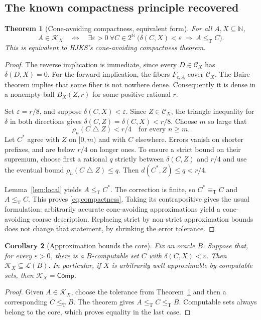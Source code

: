 \documentclass[11pt,a4paper]{article}
\newcommand{\N}{\mathbb N}
\newcommand{\Cantor}{2^{\N}}
\newcommand{\leT}{\leq_{\mathrm T}}
\newcommand{\eqT}{\equiv_{\mathrm T}}
\newcommand{\CD}[1]{\mathcal C_{#1}}
\newcommand{\Core}[1]{\mathcal K_{#1}}
\newcommand{\Low}[1]{\mathcal L(#1)}
\newcommand{\Comp}{\mathsf{Comp}}
\newcommand{\sdelta}{\mathbin{\triangle}}
\newtheorem{theorem}{Theorem}[section]
\newtheorem{corollary}[theorem]{Corollary}
\theoremstyle{definition}\newtheorem{definition}[theorem]{Definition}
\theoremstyle{remark}\newtheorem{remark}[theorem]{Remark}
\begin{document}
\subsection{The known compactness principle recovered}
\begin{theorem}[Cone-avoiding compactness, equivalent form]\label{thm:compactness}
For all $A,X\subseteq\N$,
\begin{equation}\label{eq:compactness}
 A\in\Core X\quad\Longleftrightarrow\quad
 \exists\varepsilon>0\ \forall C\in\Cantor\
 \bigl(\delta(C,X)<\varepsilon\ \Longrightarrow\ A\leT C\bigr).
\end{equation}
This is equivalent to HJKS's cone-avoiding compactness theorem.\cite[Theorem 3.7]{HJKS}
\end{theorem}
\begin{proof}
The reverse implication is immediate, since every $D\in\CD X$ has $\delta(D,X)=0$. For the forward implication, the fibers $F_{e,A}$ cover $\CD X$. The Baire theorem implies that some fiber is not nowhere dense. Consequently it is dense in a nonempty ball $B_X(Z,r)$ for some positive rational $r$.

Set $\varepsilon=r/8$, and suppose $\delta(C,X)<\varepsilon$. Since $Z\in\CD X$, the triangle inequality for $\delta$ in both directions gives
$\delta(C,Z)=\delta(C,X)<r/8$. Choose $m$ so large that
\[
             \rho_n(C\sdelta Z)<r/4\quad\text{for every }n\ge m.
\]
Let $C^*$ agree with $Z$ on $[0,m)$ and with $C$ elsewhere. Errors vanish on shorter prefixes, and are below $r/4$ on longer ones. To ensure a strict bound on their supremum, choose first a rational $q$ strictly between $\delta(C,Z)$ and $r/4$ and use the eventual bound $\rho_n(C\sdelta Z)\le q$. Then $d(C^*,Z)\le q<r/4$.

Lemma~\ref{lem:local} yields $A\leT C^*$. The correction is finite, so $C^*\eqT C$ and $A\leT C$. This proves \eqref{eq:compactness}. Taking its contrapositive gives the usual formulation: arbitrarily accurate cone-avoiding approximations yield a cone-avoiding coarse description. Replacing strict by non-strict approximation bounds does not change that statement, by shrinking the error tolerance.
\end{proof}

\begin{corollary}[Approximation bounds the core]\label{cor:approx}
Fix an oracle $B$. Suppose that, for every $\varepsilon>0$, there is a $B$-computable set $C$ with $\delta(C,X)<\varepsilon$. Then $\Core X\subseteq\Low B$. In particular, if $X$ is arbitrarily well approximable by computable sets, then $\Core X=\Comp$.
\end{corollary}
\begin{proof}
Given $A\in\Core X$, choose the tolerance from Theorem~\ref{thm:compactness} and then a corresponding $C\leT B$. The theorem gives $A\leT C\leT B$. Computable sets always belong to the core, which proves equality in the last case.
\end{proof}
\end{document}

